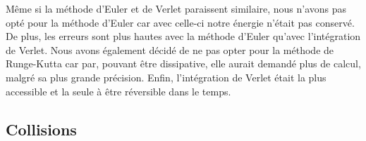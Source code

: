         Même si la méthode d'Euler et de Verlet paraissent similaire, nous n'avons pas opté pour la méthode d'Euler car avec celle-ci notre énergie n'était pas conservé. De plus, les erreurs sont plus hautes avec la méthode d'Euler qu'avec l'intégration de Verlet. Nous avons également décidé de ne pas opter pour la méthode de Runge-Kutta car par, pouvant être dissipative, elle aurait demandé plus de calcul, malgré sa plus grande précision. Enfin, l'intégration de Verlet était la plus accessible et la seule à être réversible dans le temps\cite{crivelli_stormer-verlet_2008}.
    \subsection{Collisions}
